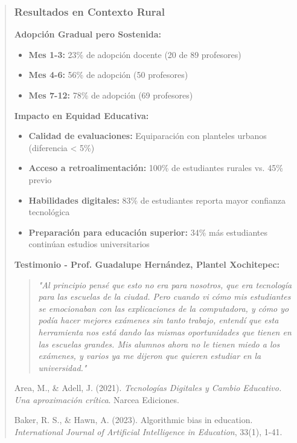 \documentclass[12pt,a4paper]{report}
\begin{document}
\begin{quote}
\subsubsection{Resultados en Contexto Rural}

\textbf{Adopción Gradual pero Sostenida:}
\begin{itemize}
\item \textbf{Mes 1-3:} 23\% de adopción docente (20 de 89 profesores)
\item \textbf{Mes 4-6:} 56\% de adopción (50 profesores)
\item \textbf{Mes 7-12:} 78\% de adopción (69 profesores)
\end{itemize}

\textbf{Impacto en Equidad Educativa:}
\begin{itemize}
\item \textbf{Calidad de evaluaciones:} Equiparación con planteles urbanos (diferencia < 5\%)
\item \textbf{Acceso a retroalimentación:} 100\% de estudiantes rurales vs. 45\% previo
\item \textbf{Habilidades digitales:} 83\% de estudiantes reporta mayor confianza tecnológica
\item \textbf{Preparación para educación superior:} 34\% más estudiantes continúan estudios universitarios
\end{itemize}

\textbf{Testimonio - Prof. Guadalupe Hernández, Plantel Xochitepec:}
\begin{quote}
\textit{"Al principio pensé que esto no era para nosotros, que era tecnología para las escuelas de la ciudad. Pero cuando vi cómo mis estudiantes se emocionaban con las explicaciones de la computadora, y cómo yo podía hacer mejores exámenes sin tanto trabajo, entendí que esta herramienta nos está dando las mismas oportunidades que tienen en las escuelas grandes. Mis alumnos ahora no le tienen miedo a los exámenes, y varios ya me dijeron que quieren estudiar en la universidad."}
\end{quote}

\begin{thebibliography}{99}

Area, M., \& Adell, J. (2021). \textit{Tecnologías Digitales y Cambio Educativo. Una aproximación crítica}. Narcea Ediciones.

Baker, R. S., \& Hawn, A. (2023). Algorithmic bias in education. \textit{International Journal of Artificial Intelligence in Education}, 33(1), 1-41.


\end{thebibliography}
\end{quote}
\end{document}
